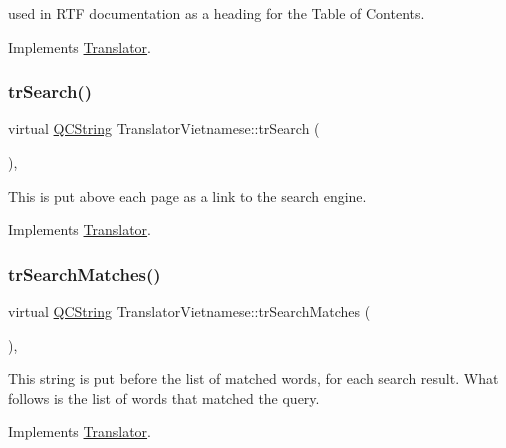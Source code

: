 used in R\+TF documentation as a heading for the Table of Contents. 

Implements \mbox{\hyperlink{class_translator}{Translator}}.

\mbox{\label{class_translator_vietnamese_a6da142bb9d430f99f2507772f814d235}} 
\subsubsection{\texorpdfstring{trSearch()}{trSearch()}}
{\footnotesize\ttfamily virtual \mbox{\hyperlink{class_q_c_string}{Q\+C\+String}} Translator\+Vietnamese\+::tr\+Search (\begin{DoxyParamCaption}{ }\end{DoxyParamCaption})\hspace{0.3cm}{\ttfamily [inline]}, {\ttfamily [virtual]}}

This is put above each page as a link to the search engine. 

Implements \mbox{\hyperlink{class_translator}{Translator}}.

\mbox{\label{class_translator_vietnamese_a38708ebc35882b46325bbee55065d2b6}} 
\subsubsection{\texorpdfstring{trSearchMatches()}{trSearchMatches()}}
{\footnotesize\ttfamily virtual \mbox{\hyperlink{class_q_c_string}{Q\+C\+String}} Translator\+Vietnamese\+::tr\+Search\+Matches (\begin{DoxyParamCaption}{ }\end{DoxyParamCaption})\hspace{0.3cm}{\ttfamily [inline]}, {\ttfamily [virtual]}}

This string is put before the list of matched words, for each search result. What follows is the list of words that matched the query. 

Implements \mbox{\hyperlink{class_translator}{Translator}}.

\mbox{\label{class_translator_vietnamese_ad09691682e602a30fcf0f7fa140bb20e}} 
